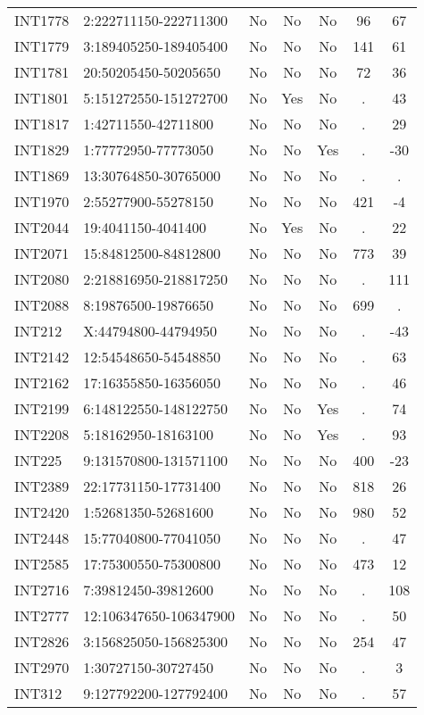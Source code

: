 \begin{longtable}{llccccc}
INT1778 & 2:222711150-222711300 & No & No & No & 96 & 67 \\
INT1779 & 3:189405250-189405400 & No & No & No & 141 & 61 \\
INT1781 & 20:50205450-50205650 & No & No & No & 72 & 36 \\
INT1801 & 5:151272550-151272700 & No & Yes & No & . & 43 \\
INT1817 & 1:42711550-42711800 & No & No & No & . & 29 \\
INT1829 & 1:77772950-77773050 & No & No & Yes & . & -30 \\
INT1869 & 13:30764850-30765000 & No & No & No & . & . \\
INT1970 & 2:55277900-55278150 & No & No & No & 421 & -4 \\
INT2044 & 19:4041150-4041400 & No & Yes & No & . & 22 \\
INT2071 & 15:84812500-84812800 & No & No & No & 773 & 39 \\
INT2080 & 2:218816950-218817250 & No & No & No & . & 111 \\
INT2088 & 8:19876500-19876650 & No & No & No & 699 & . \\
INT212 & X:44794800-44794950 & No & No & No & . & -43 \\
INT2142 & 12:54548650-54548850 & No & No & No & . & 63 \\
INT2162 & 17:16355850-16356050 & No & No & No & . & 46 \\
INT2199 & 6:148122550-148122750 & No & No & Yes & . & 74 \\
INT2208 & 5:18162950-18163100 & No & No & Yes & . & 93 \\
INT225 & 9:131570800-131571100 & No & No & No & 400 & -23 \\
INT2389 & 22:17731150-17731400 & No & No & No & 818 & 26 \\
INT2420 & 1:52681350-52681600 & No & No & No & 980 & 52 \\
INT2448 & 15:77040800-77041050 & No & No & No & . & 47 \\
INT2585 & 17:75300550-75300800 & No & No & No & 473 & 12 \\
INT2716 & 7:39812450-39812600 & No & No & No & . & 108 \\
INT2777 & 12:106347650-106347900 & No & No & No & . & 50 \\
INT2826 & 3:156825050-156825300 & No & No & No & 254 & 47 \\
INT2970 & 1:30727150-30727450 & No & No & No & . & 3 \\
INT312 & 9:127792200-127792400 & No & No & No & . & 57 \\

\end{longtable}
